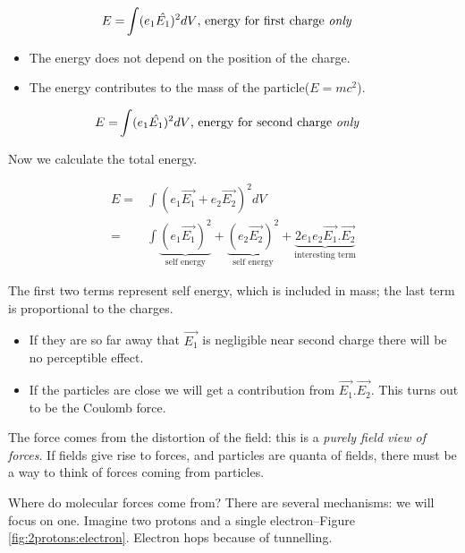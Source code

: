 \documentclass[]{article}
\begin{document}
\begin{align*}
	E=&\int (e_1 \hat{E_1})^2 dV \text{, energy for first charge \emph{only}}
\end{align*}

\begin{itemize}
	\item The energy does not depend on the position of the charge.
	\item The energy contributes to the mass of the particle($E=mc^2$).
\end{itemize}

\begin{align*}
	E=&\int (e_1 \hat{E_1})^2 dV \text{, energy for second charge \emph{only}}
\end{align*}

Now we calculate the total energy.

\begin{align*}
	E=&\int (e_1\vec{E_1}+e_2 \vec{E_2})^2 dV\\
	=&\int \underbrace{(e_1\vec{E_1})^2}_\text{self energy}+ \underbrace{(e_2\vec{E_2})^2}_\text{self energy} + \underbrace{2e_1e_2\vec{E_1}.\vec{E_2}}_\text{interesting term}
\end{align*}

The first two terms represent self energy, which is included in mass; the last term is proportional to the charges.
\begin{itemize}
	\item  If they are so far away that $\vec{E_1}$ is negligible near second charge there will be no perceptible effect.
	\item If the particles are close we will get a contribution from $\vec{E_1}.\vec{E_2}$. This turns out to be the Coulomb force. 
\end{itemize}

The force comes from the distortion of the field: this is a \emph{purely field view of forces}. If fields give rise to forces, and particles are quanta of fields, there must be a way to think of forces coming from particles.

Where do molecular forces come from? There are several mechanisms: we will focus on one. Imagine two protons and a single electron--Figure \ref{fig:2protons:electron}. Electron hops because of tunnelling.
\end{document}
